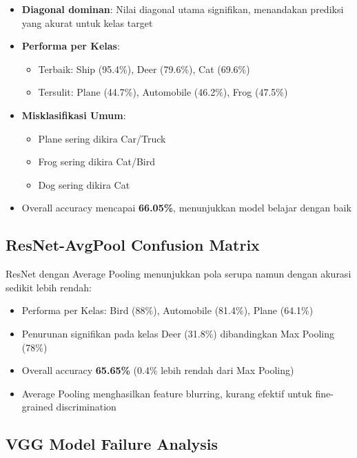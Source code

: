 \documentclass[12pt,a4paper]{report}
\begin{document}
\begin{itemize}
    \item \textbf{Diagonal dominan}: Nilai diagonal utama signifikan, menandakan prediksi yang akurat untuk kelas target
    
    \item \textbf{Performa per Kelas}:
    \begin{itemize}
        \item Terbaik: Ship (95.4\%), Deer (79.6\%), Cat (69.6\%)
        \item Tersulit: Plane (44.7\%), Automobile (46.2\%), Frog (47.5\%)
    \end{itemize}
    
    \item \textbf{Misklasifikasi Umum}:
    \begin{itemize}
        \item Plane sering dikira Car/Truck
        \item Frog sering dikira Cat/Bird
        \item Dog sering dikira Cat
    \end{itemize}
    
    \item Overall accuracy mencapai \textbf{66.05\%}, menunjukkan model belajar dengan baik
\end{itemize}

\subsection{ResNet-AvgPool Confusion Matrix}

ResNet dengan Average Pooling menunjukkan pola serupa namun dengan akurasi sedikit lebih rendah:

\begin{itemize}
    \item Performa per Kelas: Bird (88\%), Automobile (81.4\%), Plane (64.1\%)
    \item Penurunan signifikan pada kelas Deer (31.8\%) dibandingkan Max Pooling (78\%)
    \item Overall accuracy \textbf{65.65\%} (0.4\% lebih rendah dari Max Pooling)
    \item Average Pooling menghasilkan feature blurring, kurang efektif untuk fine-grained discrimination
\end{itemize}

\subsection{VGG Model Failure Analysis}
\end{document}
